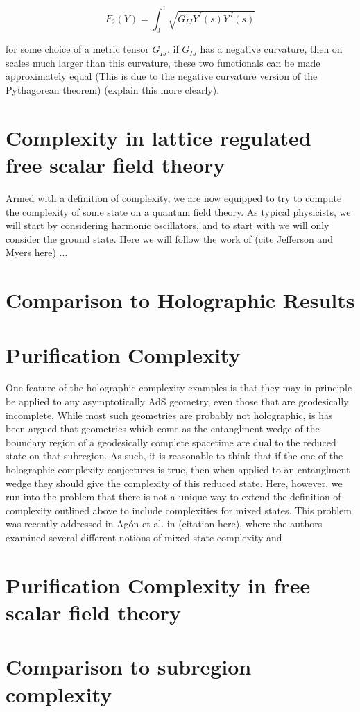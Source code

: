 \documentclass[12pt]{amsart}
\begin{document}
$$F_2(Y) = \int_0^1 \sqrt{G_{IJ} Y^I(s) Y^J(s)}$$

for some choice of a metric tensor $G_{IJ}$. if $G_{IJ}$ has a negative curvature, then on scales much larger than this curvature, these two functionals can be made approximately equal (This is due to the negative curvature version of the Pythagorean theorem) (explain this more clearly).

\section{Complexity in lattice regulated free scalar field theory}

Armed with a definition of complexity, we are now equipped to try to compute the complexity of some state on a quantum field theory. As typical physicists, we will start by considering harmonic oscillators, and to start with we will only consider the ground state. Here we will follow the work of (cite Jefferson and Myers here) ...

\section{Comparison to Holographic Results}

\section{Purification Complexity}

One feature of the holographic complexity examples is that they may in principle be applied to any asymptotically AdS geometry, even those that are geodesically incomplete. While most such geometries are probably not holographic, is has been argued that geometries which come as the entanglment wedge of the boundary region of a geodesically complete spacetime are dual to the reduced state on that subregion. As such, it is reasonable to think that if the one of the holographic complexity conjectures is true, then when applied to an entanglment wedge they should give the complexity of this reduced state. Here, however, we run into the problem that there is not a unique way to extend the definition of complexity outlined above to include complexities for mixed states. This problem was recently addressed in Ag\'on et al. in (citation here), where the authors examined several different notions of mixed state complexity and 

\section{Purification Complexity in free scalar field theory}

\section{Comparison to subregion complexity}

%

\nocite{*}
\end{document}
